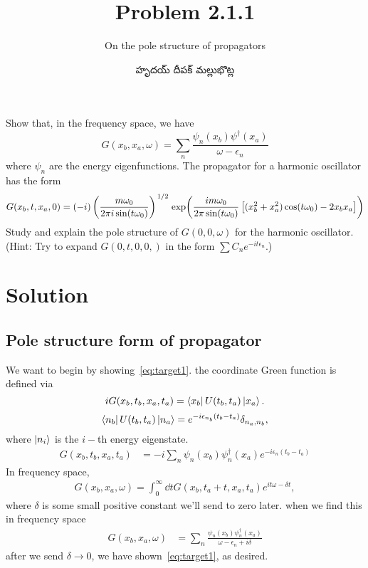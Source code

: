 \documentclass{article}
\title{Problem 2.1.1}
\subtitle{On the pole structure of propagators}
\author{\begin{telugu}హృదయ్ దీపక్ మల్లుభొట్ల\end{telugu}}
\date{}
\begin{document}
	\maketitle
	Show that, in the frequency space, we have
	\begin{equation}
		G(x_b, x_a, \omega) = \sum_n \frac{\psi_n(x_b) \psi^\dagger(x_a)}{\omega - \epsilon_n} \label{eq:target1}
	\end{equation}
	where $\psi_n$ are the energy eigenfunctions.
	The propagator for a harmonic oscillator has the form
	\begin{equation}
		G(x_b, t, x_a, 0) = (-i) \left( \frac{m \omega_0}{2 \pi i \sin(t \omega_0)} \right)^{\flatfrac12} \exp(\frac{i m \omega_0}{2 \pi \sin(t\omega_0)}\left[(x_b^2 + x_a^2)\cos(t \omega_0) - 2 x_b x_a \right]) \label{eq:harmonicoscprop}
	\end{equation}
	Study and explain the pole structure of $G(0, 0, \omega)$ for the harmonic oscillator.
	(Hint: Try to expand $G(0, t, 0, 0,)$ in the form $\sum C_n e^{-i t \epsilon_n}$.)

	\section{Solution} \label{sec:solution}
	\subsection{Pole structure form of propagator} \label{subsec:sol1}
	We want to begin by showing~\eqref{eq:target1}.
	\triv the coordinate Green function is defined via
	\begin{equation}
		i G(x_b, t_b, x_a, t_a) = \bra{x_b} U(t_b, t_a) \ket{x_a}.
	\end{equation}
	\triv
	\begin{equation}
		\bra{n_b} U(t_b, t_a) \ket{n_a} = e^{-i \epsilon_{n_b} (t_b - t_a)} \delta_{n_a, n_b},
	\end{equation}
	where $\ket{n_i}$ is the $i-$th energy eigenstate.
	\thrf
	\begin{align}
		G(x_b, t_b, x_a, t_a) &= -i \sum_{n} \psi_n(x_b) \psi_n^\dagger(x_a)  e^{-i \epsilon_{n} (t_b - t_a)}
	\end{align}
	In frequency space,
	\begin{align}
		G(x_b, x_a, \omega) = \int_0^\infty \dd{t} G(x_b, t_a + t, x_a, t_a) e^{i t \omega - \delta t},
	\end{align}
	where $\delta$ is some small positive constant we'll send to zero later.
	\triv when we find this in frequency space
	\begin{align}
		G(x_b, x_a, \omega) &= \sum_{n} \frac{\psi_n(x_b) \psi_n^\dagger(x_a)}{\omega - \epsilon_n + i \delta}
	\end{align}
	\thrf after we send $\delta \rightarrow 0$, we have shown~\eqref{eq:target1}, as desired.
\end{document}
